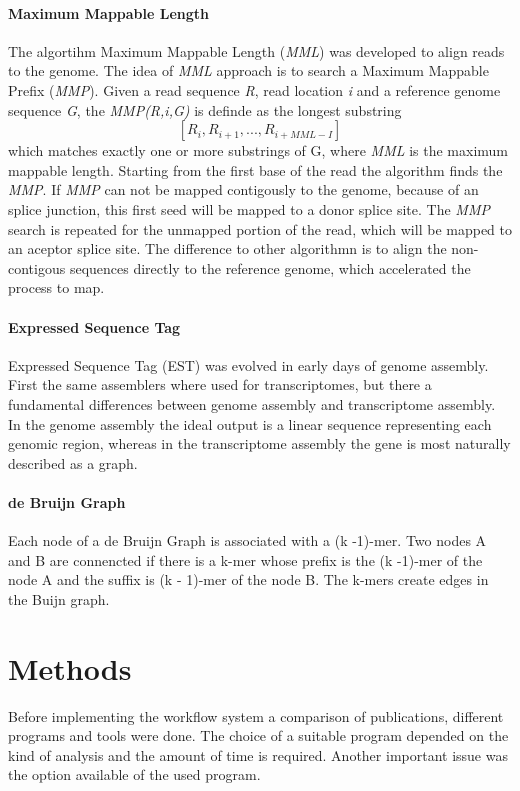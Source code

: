 \documentclass[11pt, a4paper]{report}
\begin{document}
\subsubsection{Maximum Mappable Length}\label{MML}
The algortihm Maximum Mappable Length (\textit{MML}) was developed to align reads to the genome. 
The idea of \textit{MML} approach is to search a Maximum Mappable Prefix (\textit{MMP}). Given a read sequence \textit{R}, read location \textit{i} and a reference genome sequence \textit{G}, the \textit{MMP(R,i,G)} is definde as the longest substring  
\[
		 [R_{i} , R_{i+1} , ... , R_{i+MML-I} ]
\]
which matches exactly one or more substrings of G, where \textit{MML} is the maximum mappable length. 
Starting from the first base of the read the algorithm finds the \textit{MMP}. If \textit{MMP} can not be mapped contigously to the genome, because of an splice junction, this first seed will be mapped to a donor splice site. The \textit{MMP} search is repeated for the unmapped portion of the read, which will be mapped to an aceptor splice site.
The difference to other algorithmn is to align the non-contigous sequences directly to the reference genome, which accelerated the process to map. \cite{Dobin2013}
\subsubsection{Expressed Sequence Tag}\label{EST}
Expressed Sequence Tag (EST) was evolved in early days of genome assembly. First the same assemblers where used for transcriptomes, but there a fundamental differences between genome assembly and transcriptome assembly. In the genome assembly the ideal output is a linear sequence representing each genomic region, whereas in the transcriptome assembly the gene is most naturally described as a graph.  \cite{Korpelainen2014}





\subsubsection{de Bruijn Graph}\label{Graph}
Each node of a de Bruijn Graph is associated with a (k -1)-mer. Two nodes A and B are connencted if there is a k-mer whose prefix is the (k -1)-mer of the node A and the suffix is (k - 1)-mer of the node B. The k-mers create edges in the Buijn graph. \cite{Korpelainen2014}

\newpage
\setcounter{chapter}{2}\setcounter{section}{0}
\chapter*{Methods}
Before implementing the workflow system a comparison of publications, different programs and tools were done. The choice of a suitable program depended on the kind of analysis and the amount of time is required. Another important issue was the option available of the used program. 
\end{document}
